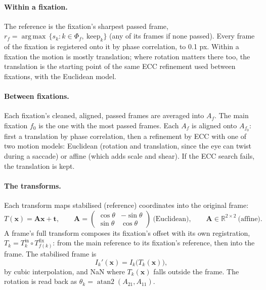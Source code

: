 \documentclass[11pt]{article}
\newcommand{\x}{\mathbf{x}}
\DeclareMathOperator*{\argmax}{arg\,max}
\begin{document}
\paragraph{Within a fixation.} The reference is the fixation's sharpest passed frame,
$r_f = \argmax\, \{ s_k : k \in \Phi_f,\ \mathrm{keep}_k \}$ (any of its frames if none passed). Every frame of the
fixation is registered onto it by phase correlation, to 0.1 px. Within a fixation the motion is mostly
translation; where rotation matters there too, the translation is the starting point of the same ECC refinement
used between fixations, with the Euclidean model.

\paragraph{Between fixations.} Each fixation's cleaned, aligned, passed frames are averaged into $A_f$. The main
fixation $f_0$ is the one with the most passed frames. Each $A_f$ is aligned onto $A_{f_0}$: first a translation by
phase correlation, then a refinement by ECC with one of two motion models: Euclidean (rotation and translation,
since the eye can twist during a saccade) or affine (which adds scale and shear). If the ECC search fails, the
translation is kept.

\paragraph{The transforms.} Each transform maps stabilised (reference) coordinates into the original frame:
\begin{equation}
  T(\x) = \mathbf A \x + \mathbf t,
  \qquad
  \mathbf A = \begin{pmatrix} \cos\theta & -\sin\theta \\ \sin\theta & \cos\theta \end{pmatrix} \ \text{(Euclidean)},
  \qquad
  \mathbf A \in \mathbb R^{2 \times 2} \ \text{(affine)}.
\end{equation}
A frame's full transform composes its fixation's offset with its own registration,
$T_k = T^{\mathrm{in}}_k \circ T^{\mathrm{fix}}_{f(k)}$: from the main reference to its fixation's reference, then
into the frame. The stabilised frame is
\begin{equation}
  I_k'(\x) = I_k\bigl(T_k(\x)\bigr),
\end{equation}
by cubic interpolation, and NaN where $T_k(\x)$ falls outside the frame. The rotation is read back as
$\theta_k = \operatorname{atan2}(A_{21}, A_{11})$.
\end{document}
